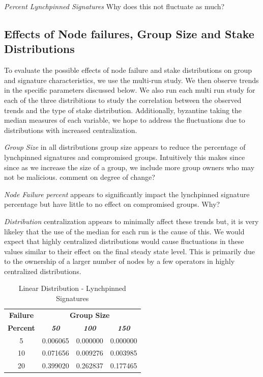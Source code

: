 \documentclass[conference]{IEEEtran}
\begin{document}
\textit{Percent Lynchpinned Signatures} Why does this not fluctuate as much?

\subsection{Effects of Node failures, Group Size and Stake Distributions}
To evaluate the possible effects of node failure and stake distributions on group and signature 
characteristics, we use the multi-run study. We then observe trends in the specific parameters 
discussed below. We also run each multi run study for each of the three distribitions to study 
the correlation between the observed trends and the type of stake distribution. Additionally, byzantine
taking the median measures of each variable, we hope to address the fluctuations due to distributions with
increased centralization. 

\textit{Group Size} in all distributions group size appears to reduce the percentage
of lynchpinned signatures and compromised groups. Intuitively this makes since since 
as we increase the size of a group, we include more group owners who may not be malicious. 
comment on degree of change?

\textit{Node Failure percent} appears to significantly impact the lynchpinned signature percentage
but have little to no effect on compromised groups. Why?

\textit{Distribution} centralization appears to minimally affect these trends but, it is very likeley
that the use of the median for each run is the cause of this. We would expect that highly centralized
distributions would cause fluctuations in these values similar to their effect on the final steady state 
level. This is primarily due to the ownership of a larger number of nodes by a few operators in highly 
centralized distributions. 

        \begin{table}[h!]
            \caption{Linear Distribution - Lynchpinned Signatures}
            \begin{center}
            \begin{tabular}{|c|c|c|c|}
            \hline
            \textbf{Failure}&\multicolumn{3}{|c|}{\textbf{Group Size}} \\
            \cline{2-4} 
            \textbf{Percent} & \textbf{\textit{50}}& \textbf{\textit{100}}& \textbf{\textit{150}} \\
            \hline
            5 &  0.006065 &  0.000000 &  0.000000 \\
            \hline
            10 &  0.071656 &  0.009276 &  0.003985 \\
            \hline
            20 &  0.399020 &  0.262837 &  0.177465 \\
            \hline
            \end{tabular}
            \label{lynchpinned_table1}
            \end{center}
        \end{table}
\end{document}
